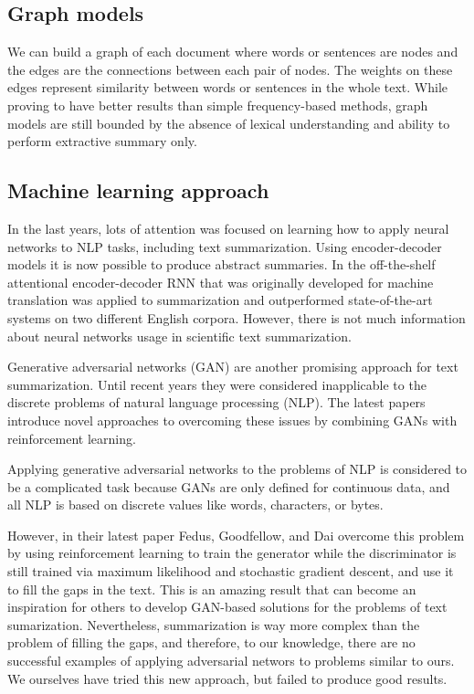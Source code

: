 \documentclass[sigplan]{acmart}
\begin{document}
\subsection{Graph models}

We can build a graph of each document where words or sentences are nodes and the edges are the connections between each pair of nodes. The weights on these edges represent similarity between words or sentences in the whole text. While proving to have better results than simple frequency-based methods, graph models are still bounded by the absence of lexical understanding and ability to perform extractive summary only.

\subsection{Machine learning approach}
\label{sec:ml}

In the last years, lots of attention was focused on learning how to apply neural networks to NLP tasks, including text summarization. Using encoder-decoder models it is now possible to produce abstract summaries. In \cite{nallapati-16} the off-the-shelf attentional encoder-decoder RNN that was originally developed for machine translation was applied to summarization and outperformed state-of-the-art systems on two different English corpora. However, there is not much information about neural networks usage in scientific text summarization.

Generative adversarial networks (GAN) are another promising approach for text summarization. Until recent years they were considered inapplicable to the discrete problems of natural language processing (NLP). The latest papers introduce novel approaches to overcoming these issues by combining GANs with reinforcement learning.

Applying generative adversarial networks to the problems of NLP is considered to be a complicated task because GANs are only defined for continuous data, and all NLP is based on discrete values like words, characters, or bytes.

However, in their latest paper Fedus, Goodfellow, and Dai\cite{fedus-18} overcome this problem by using reinforcement learning to train the generator while the discriminator is still trained via maximum likelihood and stochastic gradient descent, and use it to fill the gaps in the text. This is an amazing result that can become an inspiration for others to develop GAN-based solutions for the problems of text sumarization. Nevertheless, summarization is way more complex than the problem of filling the gaps, and therefore, to our knowledge, there are no successful examples of applying adversarial networs to problems similar to ours. We ourselves have tried this new approach, but failed to produce good results.
\end{document}
